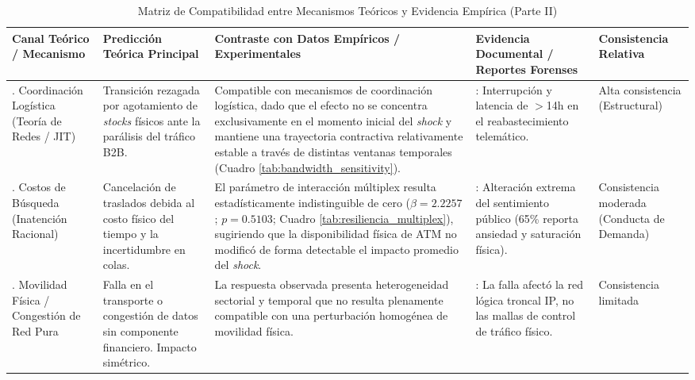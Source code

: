 \begin{table}[H]
    \centering
    \caption{Matriz de Compatibilidad entre Mecanismos Te\'oricos y Evidencia Emp\'irica (Parte II)}
    \label{tab:viabilidad_canales_p2}
    \small
    \setlength{\tabcolsep}{4pt} 
    \begin{tabularx}{\textwidth}{>{\raggedright\arraybackslash}p{2.8cm}XXX>{\raggedright\arraybackslash}p{2.3cm}}
        \toprule
        \textbf{Canal Te\'orico / Mecanismo} & \textbf{Predicci\'on Te\'orica Principal} & \textbf{Contraste con Datos Emp\'iricos / Experimentales} & \textbf{Evidencia Documental / Reportes Forenses} & \textbf{Consistencia Relativa} \\
        \midrule
        2. Coordinaci\'on Log\'istica \newline (Teor\'ia de Redes / JIT) & Transici\'on rezagada por agotamiento de \textit{stocks} f\'isicos ante la par\'alisis del tr\'afico B2B. & Compatible con mecanismos de coordinaci\'on log\'istica, dado que el efecto no se concentra exclusivamente en el momento inicial del \textit{shock} y mantiene una trayectoria contractiva relativamente estable a trav\'es de distintas ventanas temporales (Cuadro \ref{tab:bandwidth_sensitivity}). & \parencite{crtc2024rogers}: Interrupci\'on y latencia de $>$14h en el reabastecimiento telem\'atico. & Alta consistencia \newline (Estructural) \\
        \addlinespace
        3. Costos de B\'usqueda \newline (Inatenci\'on Racional) & Cancelaci\'on de traslados debida al costo f\'isico del tiempo y la incertidumbre en colas. & El par\'ametro de interacci\'on m\'ultiplex resulta estad\'isticamente indistinguible de cero ($\beta = 2.2257$; $p=0.5103$; Cuadro \ref{tab:resiliencia_multiplex}), sugiriendo que la disponibilidad f\'isica de ATM no modific\'o de forma detectable el impacto promedio del \textit{shock}. & \parencite{pollara2022}: Alteraci\'on extrema del sentimiento p\'ublico (65\% reporta ansiedad y saturaci\'on f\'isica). & Consistencia moderada \newline (Conducta de Demanda) \\
        \addlinespace
        4. Movilidad F\'isica / \newline Congesti\'on de Red Pura & Falla en el transporte o congesti\'on de datos sin componente financiero. Impacto sim\'etrico. & La respuesta observada presenta heterogeneidad sectorial y temporal que no resulta plenamente compatible con una perturbaci\'on homog\'enea de movilidad f\'isica. & \parencite{crtc2024rogers}: La falla afect\'o la red l\'ogica troncal IP, no las mallas de control de tr\'afico f\'isico. & Consistencia limitada \\
        \bottomrule
    \end{tabularx}
\end{table}

